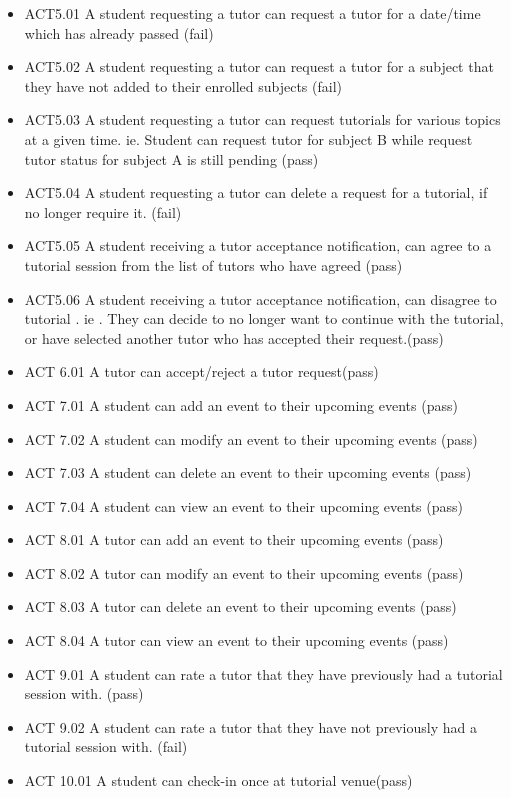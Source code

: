 \documentclass[12pt]{article}
\begin{document}
\begin{itemize}
\item ACT5.01	A student requesting a tutor can request a tutor for a date/time which has already passed  (fail)
\item ACT5.02	A student requesting a tutor can request a tutor for a subject that they have not added to their enrolled subjects  (fail)
\item ACT5.03	A student requesting a tutor can request tutorials for various topics at a given time. ie. Student can request tutor for subject B while request tutor status for subject A is still pending (pass)
\item ACT5.04	A student requesting a tutor can delete a request for a  tutorial, if no longer require it. (fail)
\item ACT5.05	A student receiving a tutor acceptance notification, can agree to a tutorial session from the list  of tutors who have agreed (pass)
\item ACT5.06 A student receiving a tutor acceptance notification, can disagree to tutorial . ie . They can decide to no longer want to continue with the tutorial, or have selected another tutor who has accepted their request.(pass)		%
\item ACT 6.01 A tutor can accept/reject a tutor request(pass)
\item ACT 7.01 A student can add an event to their upcoming events (pass)
\item ACT 7.02 A student can modify an event to their upcoming events (pass)
\item ACT 7.03 A student can delete an event to their upcoming events (pass)
\item ACT 7.04 A student can view an event to their upcoming events (pass)
\item ACT 8.01 A tutor can add an event to their upcoming events (pass)
\item ACT 8.02 A tutor can modify an event to their upcoming events (pass)
\item ACT 8.03 A tutor can delete an event to their upcoming events (pass)
\item ACT 8.04 A tutor can view an event to their upcoming events (pass)
\item ACT 9.01 A student can rate a tutor that they have previously had a tutorial session with. (pass)
\item ACT 9.02 A student can rate a tutor that they have not previously had a tutorial session with. (fail)
\item ACT 10.01 A student can check-in once at tutorial venue(pass)

\end{itemize}
\end{document}
